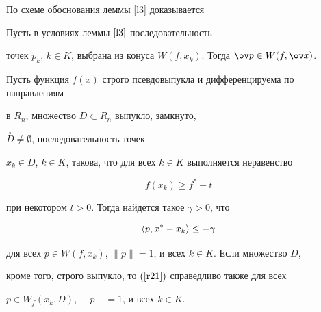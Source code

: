 По схеме обоснования леммы \ref{l3} доказывается








\begin{lem}\label{l4}


Пусть в условиях леммы $\ref{l3}$ последовательность


точек $p_k$, $k\in K$, выбрана из конуса $W(f,x_k)$. Тогда $\ov p\in W(f,


\ov x)$.


\end{lem}








\begin{lem}\label{l5}


Пусть функция $f(x)$ строго псевдовыпукла и дифференцируема по направлениям


в $R_n$, множество $D\subset R_n$ выпукло, замкнуто,


$\overset{\circ}{D}{} \ne \emptyset$, последовательность точек


$x_k \in D$, $k\in K$, такова, что для всех $k\in K$ выполняется неравенство




\begin{equation} \label{r20}


f(x_k)\ge f^*+t


\end{equation}


%


при некотором $t>0$. Тогда найдется такое $\gamma>0$, что




\begin{equation} \label{r21}


\la p, x^*-x_k \ra \le -\gamma


\end{equation}


%


для всех $p\in W(f,x_k)$, $\|p\|=1$, и всех $k\in K$. Если множество $D$,


кроме того, строго выпукло, то $(\ref{r21})$ справедливо также для всех


$p\in W_f(x_k,D)$, $\|p\|=1$, и всех $k\in K$.


\end{lem}





